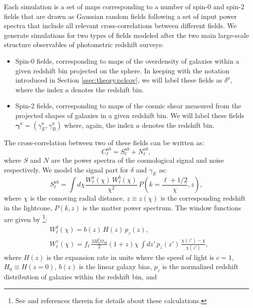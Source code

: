 \documentclass[a4paper,11pt]{article}
\begin{document}
      Each simulation is a set of maps corresponding to a number of spin-0 and spin-2 fields that are drawn as Gaussian random fields following a set of input power spectra that include all relevant cross-correlations between different fields. We generate simulations for two types of fields modeled after the two main large-scale structure observables of photometric redshift surveys:
      \begin{itemize}
        \item Spin-0 fields, corresponding to maps of the overdensity of galaxies within a given redshift bin projected on the sphere. In keeping with the notation introduced in Section \ref{ssec:theory.pclcov}, we will label these fields as $\delta^a$, where the index $a$ denotes the redshift bin.
        \item Spin-2 fields, corresponding to maps of the cosmic shear measured from the projected shapes of galaxies in a given redshift bin. We will label these fields $\boldsymbol{\gamma}^a=(\gamma_E^a,\gamma_B^a)$ where, again, the index $a$ denotes the redshift bin.
      \end{itemize}
      The cross-correlation between two of these fields can be written as:
      \begin{equation}
        C^{ab}_\ell = S^{ab}_\ell+N^{ab}_\ell,
      \end{equation}
      where $S$ and $N$ are the power spectra of the cosmological signal and noise respectively. We model the signal part for $\delta$ and $\gamma_E$ as:
      \begin{equation}
        S^{ab}_\ell = \int d\chi \frac{W^a_\ell(\chi)\,W^b_\ell(\chi)}{\chi^2}\,P\left(k=\frac{\ell+1/2}{\chi},z\right),
      \end{equation}
      where $\chi$ is the comoving radial distance, $z\equiv z(\chi)$ is the corresponding redshift in the lightcone, $P(k,z)$ is the matter power spectrum. The window functions are given by \cite{2004PhRvD..70d3009H}\footnote{See \cite{2019ApJS..242....2C} and references therein for details about these calculations.}:
      \begin{align}
        \nonumber
        &W^\delta_\ell(\chi)=b(z)\,H(z)\,p_z(z),\\
        &W^\gamma_\ell(\chi)=f_\ell\,\frac{3H_0^2\Omega_M}{2}(1+z)\chi\,\int dz'\,p_z(z')\,\frac{\chi(z')-\chi}{\chi(z')},
      \end{align}
      where $H(z)$ is the expansion rate in units where the speed of light is $c=1$, $H_0\equiv H(z=0)$, $b(z)$ is the linear galaxy bias, $p_z$ is the normalized redshift distribution of galaxies within the redshift bin, and
\end{document}
